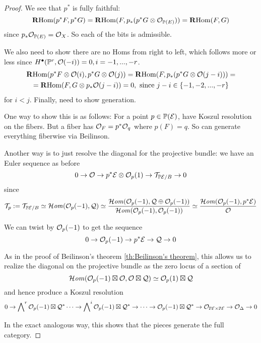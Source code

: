 \begin{proof}
    We see that $p^*$ is fully faithful:
    \begin{equation*}
        \operatorname{\mathbf{R} Hom}(p^*F,p^*G) = \operatorname{\mathbf{R} Hom}(F,p_*(p^*G\otimes\mathcal{O}_{\mathbb{P}(E)})) = \operatorname{\mathbf{R} Hom}(F,G)
    \end{equation*}
    since $p_*\mathcal{O}_{\mathbb{P}(E)}=\mathcal{O}_X$. So each of the bits is admissible. 
    
    We also need to show there are no Homs from right to left, which follows more or less since $H^\bullet(\mathbb{P}^r, \mathcal{O}(-i))=0, i=-1,...,-r$.
    \begin{gather*}
        \operatorname{\mathbf{R} Hom}(p^*F\otimes\mathcal{O}(i),p^*G\otimes\mathcal{O}(j))
            = \operatorname{\mathbf{R} Hom}(F,p_*(p^*G\otimes \mathcal{O}(j-i))) = \\
            = \operatorname{\mathbf{R} Hom}(F,G\otimes p_*\mathcal{O}(j-i)) = 0, \text{ since } j-i\in \{-1,-2,...,-r\}
    \end{gather*}
for $i<j$. Finally, need to show generation. 

One way to show this is as follows: For a point $p\in\mathbb{P}(\mathcal{E})$, have Koszul resolution on the fibers. But a fiber has $\mathcal{O}_F=p^*\mathcal{O}_q$ where $p(F)=q$. So can generate everything fiberwise via Beilinson.

Another way is to just resolve the diagonal for the projective bundle: we have an Euler sequence as before $$0\rightarrow \mathcal{O}\rightarrow p^* \mathcal{E} \otimes \mathcal{O}_{p}(1)\rightarrow \mathcal{T}_{\mathbb{P}\mathcal{E}/B}\rightarrow 0$$since $$\mathcal{T}_p:=\mathcal{T}_{\mathbb{P}\mathcal{E}/B}\simeq \operatorname{\mathcal{H}\mathit{om}}(\mathcal{O}_{p}(-1),\mathcal{Q})\simeq \frac{\operatorname{\mathcal{H}\mathit{om}}(\mathcal{O}_{p}(-1),\mathcal{Q}\oplus \mathcal{O}_{p}(-1))}{\operatorname{\mathcal{H}\mathit{om}} (\mathcal{O}_{p}(-1), \mathcal{O}_{p}(-1))}\simeq \frac{\operatorname{\mathcal{H}\mathit{om}}(\mathcal{O}_{p}(-1), p^* \mathcal{E})}{ \mathcal{O}}$$ 

We can twist by $\mathcal{O}_p(-1)$ to get the sequence $$0\rightarrow \mathcal{O}_p(-1)\rightarrow p^* \mathcal{E} \rightarrow \mathcal{Q}\rightarrow 0$$

As in the proof of Beilinson's theorem \ref{th:Beilinson's theorem}, this allows us to realize the diagonal on the projective bundle as the zero locus of a section of $$\operatorname{\mathcal{H}\mathit{om}}(\mathcal{O}_p(-1)\boxtimes \mathcal{O}, \mathcal{O}\boxtimes \mathcal{Q})\simeq \mathcal{O}_p(1) \boxtimes \mathcal{Q}$$
and hence produce a Koszul resolution $$0\rightarrow \bigwedge\nolimits^r \mathcal{O}_p(-1) \boxtimes \mathcal{Q}^*\dots\rightarrow \bigwedge\nolimits^i \mathcal{O}_p(-1) \boxtimes \mathcal{Q}^*\rightarrow \dots \rightarrow \mathcal{O}_p(-1) \boxtimes \mathcal{Q}^*\rightarrow \mathcal{O}_{\mathbb{P}\mathcal{E} \times \mathbb{P}\mathcal{E}}\rightarrow \mathcal{O}_{\Delta}\rightarrow 0$$

In the exact analogous way, this shows that the pieces generate the full category.
\end{proof}


